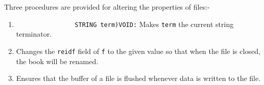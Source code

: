 Three procedures are provided for altering the properties of files:-
\begin{enumerate}
\item {}\newline
\verb|                STRING term)VOID:|\newline
Makes \verb|term| the current string terminator.
\item {}\newline
Changes the \verb|reidf| field of \verb|f| to the given value so that
when the file is closed, the book will be renamed.
\item {}
\newline
Ensures that the buffer of a file is flushed whenever data is written
to the file.
\end{enumerate}

